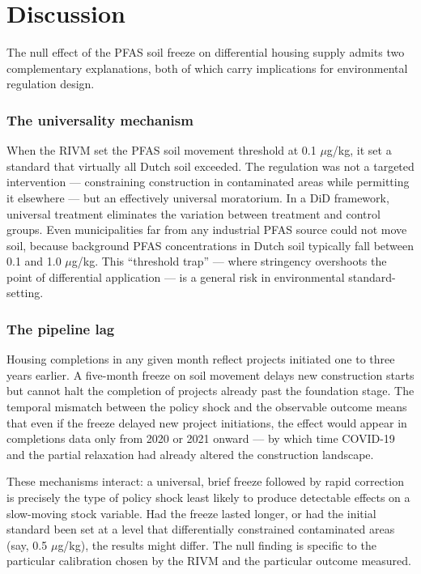 \documentclass[12pt]{article}
\begin{document}
\section{Discussion}

The null effect of the PFAS soil freeze on differential housing supply admits two complementary explanations, both of which carry implications for environmental regulation design.

\subsubsection*{The universality mechanism} When the RIVM set the PFAS soil movement threshold at 0.1 $\mu$g/kg, it set a standard that virtually all Dutch soil exceeded. The regulation was not a targeted intervention --- constraining construction in contaminated areas while permitting it elsewhere --- but an effectively universal moratorium. In a DiD framework, universal treatment eliminates the variation between treatment and control groups. Even municipalities far from any industrial PFAS source could not move soil, because background PFAS concentrations in Dutch soil typically fall between 0.1 and 1.0 $\mu$g/kg. This ``threshold trap'' --- where stringency overshoots the point of differential application --- is a general risk in environmental standard-setting.

\subsubsection*{The pipeline lag} Housing completions in any given month reflect projects initiated one to three years earlier. A five-month freeze on soil movement delays new construction starts but cannot halt the completion of projects already past the foundation stage. The temporal mismatch between the policy shock and the observable outcome means that even if the freeze delayed new project initiations, the effect would appear in completions data only from 2020 or 2021 onward --- by which time COVID-19 and the partial relaxation had already altered the construction landscape.

These mechanisms interact: a universal, brief freeze followed by rapid correction is precisely the type of policy shock least likely to produce detectable effects on a slow-moving stock variable. Had the freeze lasted longer, or had the initial standard been set at a level that differentially constrained contaminated areas (say, 0.5 $\mu$g/kg), the results might differ. The null finding is specific to the particular calibration chosen by the RIVM and the particular outcome measured.
\end{document}
